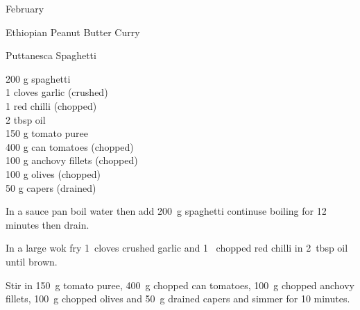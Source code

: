\begin{menu}{February}
\begin{recipe}{2}{Ethiopian Peanut Butter Curry}
\begin{instructions}
    \end{instructions}
    \end{recipe}%
  
    \begin{recipe}{1}{Puttanesca Spaghetti}%
		\begin{ingredients}
		200 g spaghetti  \\
	1 cloves garlic (crushed) \\
	1  red chilli (chopped) \\
	2 tbsp oil  \\
	150 g tomato puree  \\
	400 g can tomatoes (chopped) \\
	100 g anchovy fillets (chopped) \\
	100 g olives (chopped) \\
	50 g capers (drained) \\
	
		\end{ingredients}
	
    \begin{instructions}
    \item 
      In a sauce pan boil water then add
      200~g  spaghetti
      continuse boiling for 12  minutes then drain.
    \item 
        In a large wok fry
        1~cloves crushed garlic
        and
        1~ chopped red chilli
        in
        2~tbsp  oil
        until brown.
      \item 
        Stir in
        150~g  tomato puree,
        400~g chopped can tomatoes,
        100~g chopped anchovy fillets,
        100~g chopped olives
        and
        50~g drained capers
        and simmer for 10 minutes.
      
    \end{instructions}
    \end{recipe}%
  
    \clearpage
    \end{menu}
	

